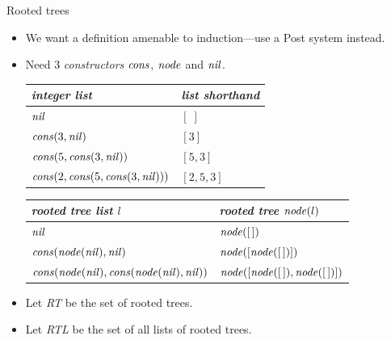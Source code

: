 \documentclass[style=sailor,size=12pt]{powerdot}
\newcommand{\id}[1]{\mbox{\it #1\/}}
\begin{document}
\begin{wideslide}[bm=,toc=]{Rooted trees}
\begin{itemize}
\item We want a definition amenable to induction---use a Post system instead.
\item Need 3 {\em constructors\/} $\id{cons}$, $\id{node}$ and $\id{nil}$.

\vspace{1em}
\begin{tabular}{|ll|} \hline
{\em integer list\/} & {\em list shorthand} \\ \hline
$\id{nil}$ & $[\;]$ \\
$\id{cons}(3,\id{nil})$ & $[3]$ \\
$\id{cons}(5,\id{cons}(3,\id{nil}))$ & $[5,3]$ \\
$\id{cons}(2,\id{cons}(5,\id{cons}(3,\id{nil})))$ & $[2,5,3]$ \\ \hline
\end{tabular}

\vspace{1em}
\begin{tabular}{|ll|} \hline
{\em rooted tree list $l$\/} & {\em rooted tree} $\id{node}(l)$  \\ \hline
$\id{nil}$ & $\id{node}([\,])$ \\
$\id{cons}(\id{node}(\id{nil}),\id{nil})$ & 
$\id{node}([\id{node}([\,])])$ \\
$\id{cons}(\id{node}(\id{nil}),\id{cons}(\id{node}(\id{nil}),\id{nil}))$ &
$\id{node}(\left [\id{node}([\,]),\id{node}([\,]) \right])$ \\ \hline
\end{tabular}
\vspace{1em}
\item Let {\em RT\/} be the set of rooted trees.
\item Let {\em RTL\/} be the set of all lists of rooted trees.
\end{itemize}
\end{wideslide}

 
\end{document}
